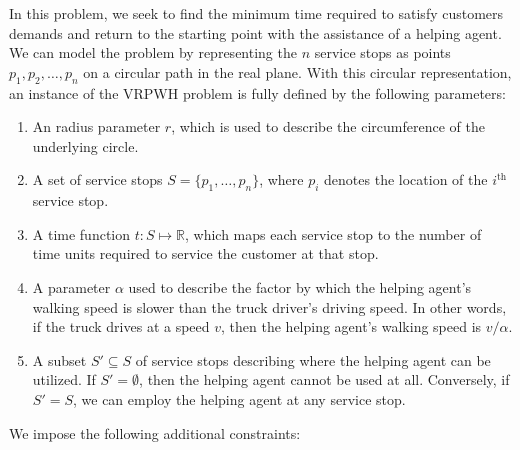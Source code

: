 \documentclass[12pt]{scrartcl}
\begin{document}
In this problem, we seek to find the minimum time required to satisfy customers demands and return to the starting point with the assistance of a helping agent. \\

\noindent We can model the problem by representing the $n$ service stops as points $p_1, p_2, \ldots, p_n$ on a circular path in the real plane. With this circular representation, an instance of the VRPWH problem is fully defined by the following parameters:

\begin{enumerate}
    \item An radius parameter $r$, which is used to describe the circumference of the underlying circle.
    \item A set of service stops $S = \{p_1, \ldots, p_n\}$, where $p_i$ denotes the location of the $i^{\text{th}}$ service stop.
    \item A time function $t : S \mapsto \mathbb{R}$, which maps each service stop to the number of time units required to service the customer at that stop.
    \item A parameter $\alpha$ used to describe the factor by which the helping agent's walking speed is slower than the truck driver's driving speed. In other words, if the truck drives at a speed $v$, then the helping agent's walking speed is $v/\alpha$.
    \item A subset $S' \subseteq S$ of service stops describing where the helping agent can be utilized. If $S' = \emptyset$, then the helping agent cannot be used at all. Conversely, if $S' = S$, we can employ the helping agent at any service stop. 
\end{enumerate}


We impose the following additional constraints: 
\end{document}
